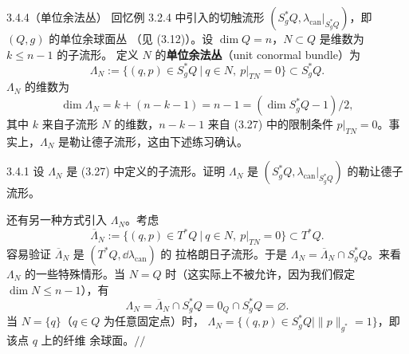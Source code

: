 \begin{wexam}{3.4.4}（单位余法丛）
回忆例 3.2.4 中引入的切触流形
$(S^*_gQ,\lambda_{\mathrm{can}}|_{S^*_gQ})$，即 $(Q,g)$ 的单位余球面丛
（见 (3.12)）。设 $\dim Q=n$，$N\subset Q$ 是维数为 $k\le n-1$ 的子流形。
定义 $N$ 的\textbf{单位余法丛}（unit conormal bundle）为
\begin{equation}\tag{3.27}
  \Lambda_N:=\bigl\{(q,p)\in S^*_gQ\ \big|\ q\in N,\ p|_{TN}=0\bigr\}
  \subset S^*_gQ .
\end{equation}
$\Lambda_N$ 的维数为
\[
  \dim\Lambda_N=k+(n-k-1)=n-1=(\dim S^*_gQ-1)/2,
\]
其中 $k$ 来自子流形 $N$ 的维数，$n-k-1$ 来自 (3.27) 中的限制条件
$p|_{TN}=0$。事实上，$\Lambda_N$ 是勒让德子流形，这由下述练习确认。

\begin{wexer}{3.4.1}
设 $\Lambda_N$ 是 (3.27) 中定义的子流形。证明 $\Lambda_N$ 是
$(S^*_gQ,\lambda_{\mathrm{can}}|_{S^*_gQ})$ 的勒让德子流形。
\end{wexer}

还有另一种方式引入 $\Lambda_N$。考虑
\begin{equation}\tag{3.28}
  \overline{\Lambda}_N
  :=\bigl\{(q,p)\in T^*Q\ \big|\ q\in N,\ p|_{TN}=0\bigr\}\subset T^*Q .
\end{equation}
容易验证 $\overline{\Lambda}_N$ 是 $(T^*Q,\dd\lambda_{\mathrm{can}})$ 的
拉格朗日子流形。于是 $\Lambda_N=\overline{\Lambda}_N\cap S^*_gQ$。来看
$\Lambda_N$ 的一些特殊情形。当 $N=Q$ 时（这实际上不被允许，因为我们假定
$\dim N\le n-1$），有
\[
  \Lambda_N=\overline{\Lambda}_N\cap S^*_gQ=0_Q\cap S^*_gQ=\varnothing .
\]
当 $N=\{q\}$（$q\in Q$ 为任意固定点）时，
$\Lambda_N=\{(q,p)\in S^*_gQ\mid\|p\|_{g^*}=1\}$，即该点 $q$ 上的纤维
余球面。\hfill$//$
\end{wexam}
